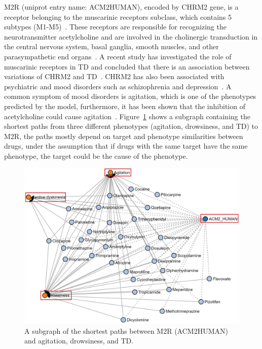 M2R (uniprot entry name: ACM2\textunderscore HUMAN), encoded by CHRM2 gene, is a receptor belonging to the muscarinic receptors subclass, which contains 5 subtypes (M1-M5)~\cite{kleinz_chapter_2008}.
These receptors are responsible for recognizing the neurotransmitter acetylcholine and are involved in the cholinergic transduction in the central nervous system, basal ganglia, smooth muscles, and other parasympathetic end organs~\cite{aronstam_muscarinic_2009}.
A recent study has investigated the role of muscarinic receptors in \ac{TD} and concluded that there is an association between variations of CHRM2 and \ac{TD}~\cite{boiko_pharmacogenetics_2019}.
CHRM2 has also been associated with psychiatric and mood disorders such as schizophrenia and depression~\cite{drevets_antidepressant_2013, jeon_role_2015, dean_possible_2015}.
A common symptom of mood disorders is agitation, which is one of the phenotypes predicted by the model, furthermore, it has been shown that the inhibition of acetylcholine could cause agitation~\cite{carlson_physiology_2019}.
Figure~\ref{fig:chrm2_phenotypes} shows a subgraph containing the shortest paths from three different phenotypes (agitation, drowsiness, and \ac{TD}) to M2R, the paths mostly depend on target and phenotype similarities between drugs, under the assumption that if drugs with the same target have the same phenotype, the target could be the cause of the phenotype.

\begin{figure}[h!]
    \centering
    \includegraphics[scale=0.6]
    {figures/chrm2_phenotypes.jpg}
    \caption[The shortest paths between M2R, agitation, drowsiness, and tardive dyskinesia]{\label{fig:chrm2_phenotypes} A subgraph of the shortest paths between M2R (ACM2\textunderscore HUMAN) and agitation, drowsiness, and \ac{TD}.}
\end{figure}


